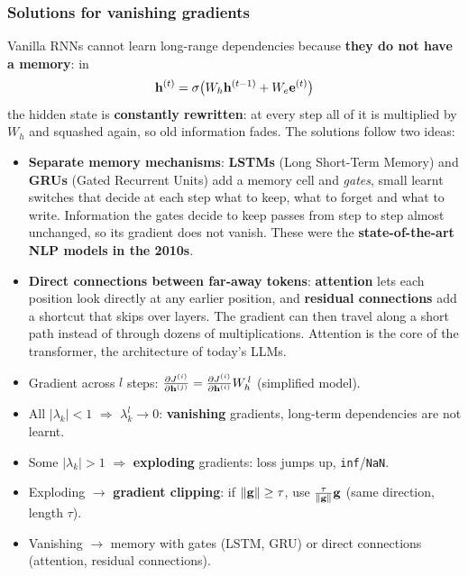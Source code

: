 \subsubsection{Solutions for vanishing gradients}

Vanilla RNNs cannot learn long-range dependencies because \textbf{they do not have a
memory}: in
\[
  \mathbf{h}^{(t)} = \sigma\bigl(W_h \mathbf{h}^{(t-1)} + W_e \mathbf{e}^{(t)}\bigr)
\]
the hidden state is \textbf{constantly rewritten}: at every step all of it is
multiplied by $W_h$ and squashed again, so old information fades. The solutions
follow two ideas:
\begin{itemize}
  \item \textbf{Separate memory mechanisms}: \textbf{LSTMs} (Long Short-Term Memory) and
        \textbf{GRUs} (Gated Recurrent Units) add a memory cell and \emph{gates}, small
        learnt switches that decide at each step what to keep, what to forget and what
        to write. Information the gates decide to keep passes from step to step almost
        unchanged, so its gradient does not vanish. These were the
        \textbf{state-of-the-art NLP models in the 2010s}.
  \item \textbf{Direct connections between far-away tokens}: \textbf{attention} lets
        each position look directly at any earlier position, and \textbf{residual
        connections} add a shortcut that skips over layers. The gradient can then
        travel along a short path instead of through dozens of multiplications.
        Attention is the core of the transformer, the architecture of today's LLMs.
\end{itemize}

\begin{nbsummary}
\begin{itemize}[nosep]
  \item Gradient across $l$ steps: $\frac{\partial J^{(i)}}{\partial \mathbf{h}^{(j)}} =
        \frac{\partial J^{(i)}}{\partial \mathbf{h}^{(i)}} W_h^{\,l}$ (simplified model).
  \item All $|\lambda_k| < 1$ $\Rightarrow$ $\lambda_k^l \to 0$: \textbf{vanishing}
        gradients, long-term dependencies are not learnt.
  \item Some $|\lambda_k| > 1$ $\Rightarrow$ \textbf{exploding} gradients: loss jumps
        up, \texttt{inf}/\texttt{NaN}.
  \item Exploding $\to$ \textbf{gradient clipping}: if $\lVert \mathbf{g}\rVert \ge \tau$, use
        $\frac{\tau}{\lVert \mathbf{g}\rVert}\mathbf{g}$ (same direction, length $\tau$).
  \item Vanishing $\to$ memory with gates (LSTM, GRU) or direct connections
        (attention, residual connections).
\end{itemize}
\end{nbsummary}

